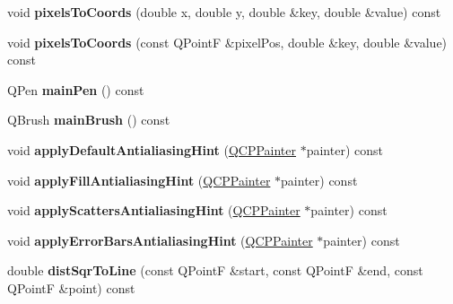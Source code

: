 \begin{DoxyCompactItemize}
\item 
\hypertarget{classQCPAbstractPlottable_a10408828446e9e0681c46d65120f382e}{void {\bfseries pixels\-To\-Coords} (double x, double y, double \&key, double \&value) const }\label{classQCPAbstractPlottable_a10408828446e9e0681c46d65120f382e}

\item 
\hypertarget{classQCPAbstractPlottable_a3e2c361cfcdfd5d803ada4d333a07e15}{void {\bfseries pixels\-To\-Coords} (const Q\-Point\-F \&pixel\-Pos, double \&key, double \&value) const }\label{classQCPAbstractPlottable_a3e2c361cfcdfd5d803ada4d333a07e15}

\item 
\hypertarget{classQCPAbstractPlottable_a19276ed2382a3a06464417b8788b1451}{Q\-Pen {\bfseries main\-Pen} () const }\label{classQCPAbstractPlottable_a19276ed2382a3a06464417b8788b1451}

\item 
\hypertarget{classQCPAbstractPlottable_ae74c123832da180c17e22203e748d9b7}{Q\-Brush {\bfseries main\-Brush} () const }\label{classQCPAbstractPlottable_ae74c123832da180c17e22203e748d9b7}

\item 
\hypertarget{classQCPAbstractPlottable_a76e9d6cc7972dc1528f526d163766aca}{void {\bfseries apply\-Default\-Antialiasing\-Hint} (\hyperlink{classQCPPainter}{Q\-C\-P\-Painter} $\ast$painter) const }\label{classQCPAbstractPlottable_a76e9d6cc7972dc1528f526d163766aca}

\item 
\hypertarget{classQCPAbstractPlottable_ac08a480155895e674dbfe5a5670e0ff3}{void {\bfseries apply\-Fill\-Antialiasing\-Hint} (\hyperlink{classQCPPainter}{Q\-C\-P\-Painter} $\ast$painter) const }\label{classQCPAbstractPlottable_ac08a480155895e674dbfe5a5670e0ff3}

\item 
\hypertarget{classQCPAbstractPlottable_a753272ee225a62827e90c3e1e78de4b1}{void {\bfseries apply\-Scatters\-Antialiasing\-Hint} (\hyperlink{classQCPPainter}{Q\-C\-P\-Painter} $\ast$painter) const }\label{classQCPAbstractPlottable_a753272ee225a62827e90c3e1e78de4b1}

\item 
\hypertarget{classQCPAbstractPlottable_af687bfe6160255960558eb71f1f81e73}{void {\bfseries apply\-Error\-Bars\-Antialiasing\-Hint} (\hyperlink{classQCPPainter}{Q\-C\-P\-Painter} $\ast$painter) const }\label{classQCPAbstractPlottable_af687bfe6160255960558eb71f1f81e73}

\item 
\hypertarget{classQCPAbstractPlottable_a5ea1cab44ca912dcdc96ed81ec5bed5d}{double {\bfseries dist\-Sqr\-To\-Line} (const Q\-Point\-F \&start, const Q\-Point\-F \&end, const Q\-Point\-F \&point) const }\label{classQCPAbstractPlottable_a5ea1cab44ca912dcdc96ed81ec5bed5d}

\end{DoxyCompactItemize}
